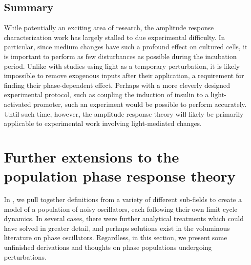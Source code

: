\subsection{Summary}

While potentially an exciting area of research, the amplitude response characterization work has largely stalled to due experimental difficulty.
In particular, since medium changes have such a profound effect on cultured cells, it is important to perform as few disturbances as possible during the incubation period.
Unlike with studies using light as a temporary perturbation, it is likely impossible to remove exogenous inputs after their application, a requirement for finding their phase-dependent effect.
Perhaps with a more cleverly designed experimental protocol, such as coupling the induction of insulin to a light-activated promoter, such an experiment would be possible to perform accurately.
Until such time, however, the amplitude response theory will likely be primarily applicable to experimental work involving light-mediated changes.


\section{Further extensions to the population phase response theory}\label{sec:prd}

In , we pull together definitions from a variety of different sub-fields to create a model of a population of noisy oscillators, each following their own limit cycle dynamics. 
In several cases, there were further analytical treatments which could have solved in greater detail, and perhaps solutions exist in the voluminous literature on phase oscillators.
Regardless, in this section, we present some unfinished derivations and thoughts on phase populations undergoing perturbations.

